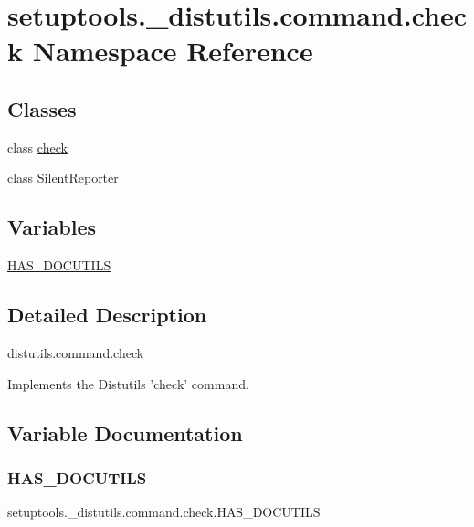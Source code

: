 \hypertarget{namespacesetuptools_1_1__distutils_1_1command_1_1check}{}\section{setuptools.\+\_\+distutils.\+command.\+check Namespace Reference}
\label{namespacesetuptools_1_1__distutils_1_1command_1_1check}
\subsection*{Classes}
\begin{DoxyCompactItemize}
\item 
class \hyperlink{classsetuptools_1_1__distutils_1_1command_1_1check_1_1check}{check}
\item 
class \hyperlink{classsetuptools_1_1__distutils_1_1command_1_1check_1_1SilentReporter}{Silent\+Reporter}
\end{DoxyCompactItemize}
\subsection*{Variables}
\begin{DoxyCompactItemize}
\item 
\hyperlink{namespacesetuptools_1_1__distutils_1_1command_1_1check_a5e939fb3bc3db0784615f5b4161565f2}{H\+A\+S\+\_\+\+D\+O\+C\+U\+T\+I\+LS}
\end{DoxyCompactItemize}


\subsection{Detailed Description}
\begin{DoxyVerb}distutils.command.check

Implements the Distutils 'check' command.
\end{DoxyVerb}
 

\subsection{Variable Documentation}
\mbox{\label{namespacesetuptools_1_1__distutils_1_1command_1_1check_a5e939fb3bc3db0784615f5b4161565f2}} 
\subsubsection{\texorpdfstring{H\+A\+S\+\_\+\+D\+O\+C\+U\+T\+I\+LS}{HAS\_DOCUTILS}}
{\footnotesize\ttfamily setuptools.\+\_\+distutils.\+command.\+check.\+H\+A\+S\+\_\+\+D\+O\+C\+U\+T\+I\+LS}

